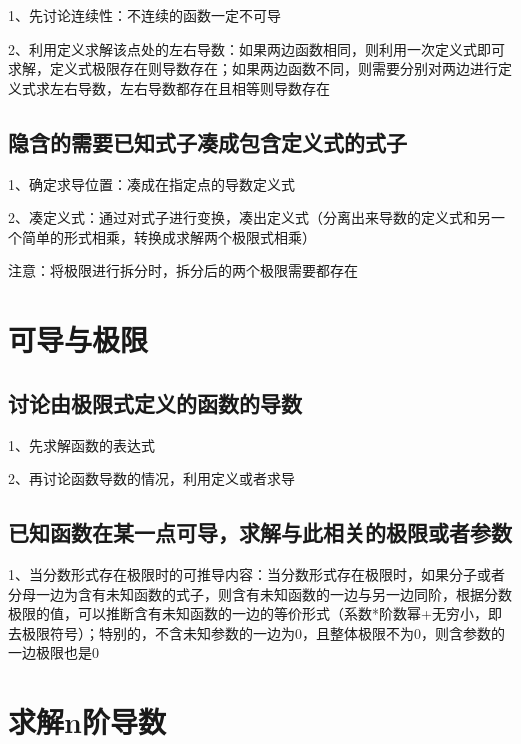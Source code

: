 1、先讨论连续性：不连续的函数一定不可导

2、利用定义求解该点处的左右导数：如果两边函数相同，则利用一次定义式即可求解，定义式极限存在则导数存在；如果两边函数不同，则需要分别对两边进行定义式求左右导数，左右导数都存在且相等则导数存在



\subsection{隐含的需要已知式子凑成包含定义式的式子}

1、确定求导位置：凑成在指定点的导数定义式

2、凑定义式：通过对式子进行变换，凑出定义式（分离出来导数的定义式和另一个简单的形式相乘，转换成求解两个极限式相乘）

注意：将极限进行拆分时，拆分后的两个极限需要都存在

\section{可导与极限}



\subsection{讨论由极限式定义的函数的导数}

1、先求解函数的表达式

2、再讨论函数导数的情况，利用定义或者求导



\subsection{已知函数在某一点可导，求解与此相关的极限或者参数}

1、当分数形式存在极限时的可推导内容：当分数形式存在极限时，如果分子或者分母一边为含有未知函数的式子，则含有未知函数的一边与另一边同阶，根据分数极限的值，可以推断含有未知函数的一边的等价形式（系数*阶数幂+无穷小，即去极限符号）；特别的，不含未知参数的一边为0，且整体极限不为0，则含参数的一边极限也是0

\section{求解n阶导数}

